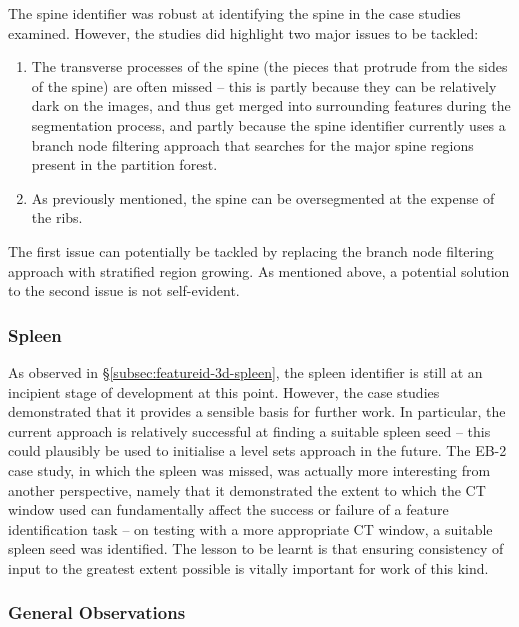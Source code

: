 The spine identifier was robust at identifying the spine in the case studies examined. However, the studies did highlight two major issues to be tackled:
%
\begin{enumerate}

\item The transverse processes of the spine (the pieces that protrude from the sides of the spine) are often missed -- this is partly because they can be relatively dark on the images, and thus get merged into surrounding features during the segmentation process, and partly because the spine identifier currently uses a branch node filtering approach that searches for the major spine regions present in the partition forest.

\item As previously mentioned, the spine can be oversegmented at the expense of the ribs.

\end{enumerate}
%
The first issue can potentially be tackled by replacing the branch node filtering approach with stratified region growing. As mentioned above, a potential solution to the second issue is not self-evident.

\subsubsection{Spleen}

As observed in \S\ref{subsec:featureid-3d-spleen}, the spleen identifier is still at an incipient stage of development at this point. However, the case studies demonstrated that it provides a sensible basis for further work. In particular, the current approach is relatively successful at finding a suitable spleen seed -- this could plausibly be used to initialise a level sets approach in the future. The EB-2 case study, in which the spleen was missed, was actually more interesting from another perspective, namely that it demonstrated the extent to which the CT window used can fundamentally affect the success or failure of a feature identification task -- on testing with a more appropriate CT window, a suitable spleen seed was identified. The lesson to be learnt is that ensuring consistency of input to the greatest extent possible is vitally important for work of this kind.

\subsubsection{General Observations}

